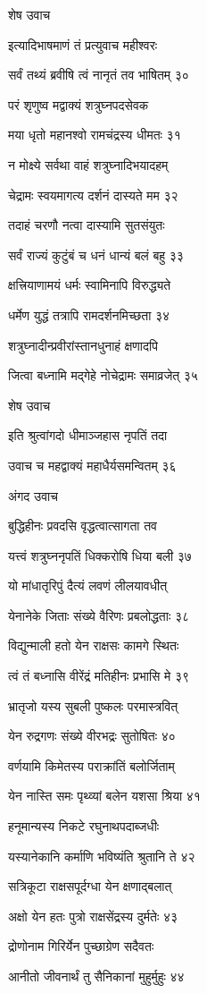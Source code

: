 शेष उवाच

इत्यादिभाषमाणं तं प्रत्युवाच महीश्वरः

सर्वं तथ्यं ब्रवीषि त्वं नानृतं तव भाषितम् ३०

परं शृणुष्व मद्वाक्यं शत्रुघ्नपदसेवक

मया धृतो महानश्वो रामचंद्रस्य धीमतः ३१

न मोक्ष्ये सर्वथा वाहं शत्रुघ्नादिभयादहम्

चेद्रामः स्वयमागत्य दर्शनं दास्यते मम ३२

तदाहं चरणौ नत्वा दास्यामि सुतसंयुतः

सर्वं राज्यं कुटुंबं च धनं धान्यं बलं बहु ३३

क्षत्त्रियाणामयं धर्मः स्वामिनापि विरुद्ध्यते

धर्मेण युद्धं तत्रापि रामदर्शनमिच्छता ३४

शत्रुघ्नादीन्प्रवीरांस्तानधुनाहं क्षणादपि

जित्वा बध्नामि मद्गेहे नोचेद्रामः समाव्रजेत् ३५

शेष उवाच

इति श्रुत्वांगदो धीमाञ्जहास नृपतिं तदा

उवाच च महद्वाक्यं महाधैर्यसमन्वितम् ३६

अंगद उवाच

बुद्धिहीनः प्रवदसि वृद्धत्वात्सागता तव

यत्त्वं शत्रुघ्ननृपतिं धिक्करोषि धिया बली ३७

यो मांधातृरिपुं दैत्यं लवणं लीलयावधीत्

येनानेके जिताः संख्ये वैरिणः प्रबलोद्धताः ३८

विद्युन्माली हतो येन राक्षसः कामगे स्थितः

त्वं तं बध्नासि वीरेंद्रं मतिहीनः प्रभासि मे ३९

भ्रातृजो यस्य सुबली पुष्कलः परमास्त्रवित्

येन रुद्रगणः संख्ये वीरभद्रः सुतोषितः ४०

वर्णयामि किमेतस्य पराक्रांतिं बलोर्जिताम्

येन नास्ति समः पृथ्व्यां बलेन यशसा श्रिया ४१

हनूमान्यस्य निकटे रघुनाथपदाब्जधीः

यस्यानेकानि कर्माणि भविष्यंति श्रुतानि ते ४२

सत्रिकूटा राक्षसपूर्दग्धा येन क्षणाद्बलात्

अक्षो येन हतः पुत्रो राक्षसेंद्रस्य दुर्मतेः ४३

द्रोणोनाम गिरिर्येन पुच्छाग्रेण सदैवतः

आनीतो जीवनार्थं तु सैनिकानां मुहुर्मुहुः ४४

